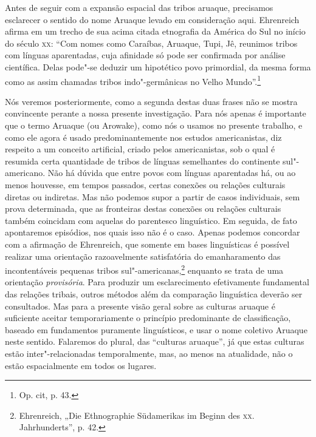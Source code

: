 Antes de seguir com a expansão espacial das tribos aruaque, precisamos
esclarecer o sentido do nome Aruaque levado em consideração aqui.
Ehrenreich afirma em um trecho de sua acima citada etnografia da América
do Sul no início do século \textsc{xx}: ``Com nomes como Caraíbas, Aruaque, Tupi,
Jê, reunimos tribos com línguas aparentadas, cuja afinidade só pode ser
confirmada por análise científica. Delas pode"-se deduzir um hipotético
povo primordial, da mesma forma como as assim chamadas tribos
indo"-germânicas no Velho Mundo''.\footnote{Op. cit, p. 43.}

Nós veremos posteriormente, como a segunda destas duas frases não se
mostra convincente perante a nossa presente investigação. Para nós
apenas é importante que o termo Aruaque (ou Arowake), como nós o usamos
no presente trabalho, e como ele agora é usado predominantemente nos
estudos americanistas, diz respeito a um conceito artificial, criado
pelos americanistas, sob o qual é resumida certa quantidade de tribos
de línguas semelhantes do continente sul"-americano. Não há dúvida que
entre povos com línguas aparentadas há, ou ao menos houvesse, em tempos
passados, certas conexões ou relações culturais diretas ou indiretas.
Mas não podemos supor a partir de casos individuais, sem prova
determinada, que as fronteiras destas conexões ou relações culturais
também coincidam com aquelas do parentesco linguístico. Em seguida, de
fato apontaremos episódios, nos quais isso não é o caso. Apenas podemos
concordar com a afirmação de Ehrenreich, que somente em bases
linguísticas é possível realizar uma orientação razoavelmente
satisfatória do emanharamento das incontentáveis pequenas tribos
sul"-americanas,\footnote{Ehrenreich, „Die Ethnographie Südamerikas im
  Beginn des \textsc{xx}. Jahrhunderts'', p. 42.} enquanto se trata de uma
orientação \emph{provisória}. Para produzir um esclarecimento
efetivamente fundamental das relações tribais, outros métodos além da
comparação linguística deverão ser consultados. Mas para a presente
visão geral sobre as culturas aruaque é suficiente aceitar
temporariamente o princípio predominante de classificação, baseado em
fundamentos puramente linguísticos, e usar o nome coletivo Aruaque neste
sentido. Falaremos do plural, das ``culturas aruaque'', já que estas
culturas estão inter"-relacionadas temporalmente, mas, ao menos na
atualidade, não o estão espacialmente em todos os lugares.

